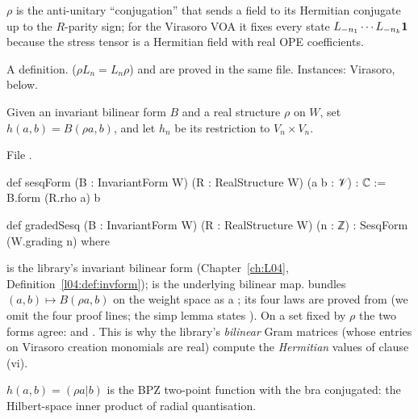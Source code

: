 \begin{physics}
$\rho$ is the anti-unitary ``conjugation'' that sends a field to its Hermitian conjugate up to the
$R$-parity sign; for the Virasoro VOA it fixes every state $L_{-n_1}\cdots L_{-n_k}\mathbf{1}$
because the stress tensor is a Hermitian field with real OPE coefficients.
\end{physics}

\begin{status}
A definition.  ($\rho L_n = L_n\rho$) and
\allowbreak{}\allowbreak{}\allowbreak{}\allowbreak{}\allowbreak{} are proved in the same file. Instances: Virasoro, below.
\end{status}

\begin{definition}\label{l19:def:gradedsesq}
Given an invariant bilinear form $B$ and a real structure $\rho$ on $W$, set
$h(a,b) = B(\rho a,b)$, and let $h_n$ be its restriction to $V_n\times V_n$.
\end{definition}

\noindent File .
\begin{leancode}
def sesqForm (B : InvariantForm W) (R : RealStructure W) (a b : 𝒱) : ℂ := B.form (R.rho a) b

def gradedSesq (B : InvariantForm W) (R : RealStructure W) (n : ℤ) : SesqForm (W.grading n) where
\end{leancode}

\begin{dictionary}
 is the library's invariant bilinear form (Chapter~\ref{ch:L04},
Definition~\ref{l04:def:invform});  is the underlying bilinear map. 
bundles $(a,b)\mapsto B(\rho a,b)$ on the weight space  as a ; its
four laws are proved from  (we omit the four proof lines; the simp lemma
 states ).
On a set fixed by $\rho$ the two forms agree:  and
. This is why the library's \emph{bilinear} Gram matrices (whose
entries on Virasoro creation monomials are real) compute the \emph{Hermitian} values of clause (vi).
\end{dictionary}

\begin{physics}
$h(a,b) = (\rho a|b)$ is the BPZ two-point function with the bra conjugated: the Hilbert-space
inner product of radial quantisation.
\end{physics}

